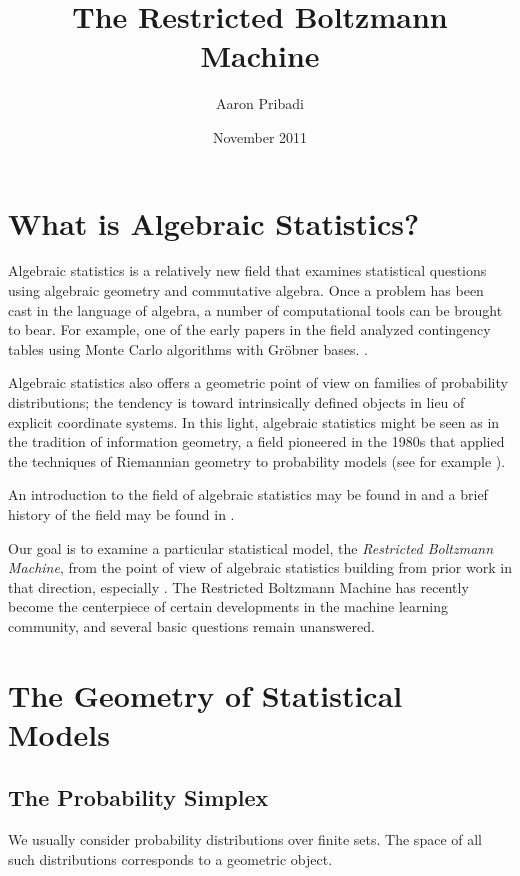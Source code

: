\documentclass[11pt,titlepage]{article}
\title{The Restricted Boltzmann Machine}
\author{Aaron Pribadi}
\date{November 2011}
\numberwithin{equation}{section}
\begin{document}
\maketitle

\tableofcontents

\pagebreak

\section{What is Algebraic Statistics?}

    Algebraic statistics is a relatively new field that examines statistical
    questions using algebraic geometry and commutative algebra.  Once a problem
    has been cast in the language of algebra, a number of computational tools
    can be brought to bear.  For example, one of the early papers in the field
    analyzed contingency tables using Monte Carlo algorithms with Gröbner bases.
    \cite{DS98}.

    Algebraic statistics also offers a geometric point of view on families of
    probability distributions; the tendency is toward intrinsically defined
    objects in lieu of explicit coordinate systems.  In this light, algebraic
    statistics might be seen as in the tradition of information geometry, a
    field pioneered in the 1980s that applied the techniques of Riemannian
    geometry to probability models (see for example \cite{Ama}).

    An introduction to the field of algebraic statistics may be found in
    \cite{DSS08} and a brief history of the field may be found in \cite{Ric09}.

    Our goal is to examine a particular statistical model, the \emph{Restricted
    Boltzmann Machine}, from the point of view of algebraic statistics building
    from prior work in that direction, especially \cite{CMS09}.  The Restricted
    Boltzmann Machine has recently become the centerpiece of certain
    developments in the machine learning community, and several basic questions
    remain unanswered.

\section{The Geometry of Statistical Models}
    \subsection{The Probability Simplex}

    We usually consider probability distributions over finite sets.  The space
    of all such distributions corresponds to a geometric object.
    
\end{document}
